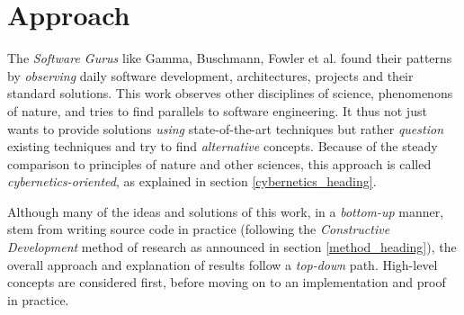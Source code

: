 %
%
%
%
%
%
%

\section{Approach}
\label{approach_heading}

The \emph{Software Gurus} like Gamma, Buschmann, Fowler et al. found their
patterns by \emph{observing} daily software development, architectures, projects
and their standard solutions. This work observes other disciplines of science,
phenomenons of nature, and tries to find parallels to software engineering. It
thus not just wants to provide solutions \emph{using} state-of-the-art techniques
but rather \emph{question} existing techniques and try to find \emph{alternative}
concepts. Because of the steady comparison to principles of nature and other
sciences, this approach is called \emph{cybernetics-oriented}, as explained in
section \ref{cybernetics_heading}.

Although many of the ideas and solutions of this work, in a \emph{bottom-up}
manner, stem from writing source code in practice (following the
\emph{Constructive Development} method of research as announced in section
\ref{method_heading}), the overall approach and explanation of results follow a
\emph{top-down} path. High-level concepts are considered first, before moving
on to an implementation and proof in practice.





